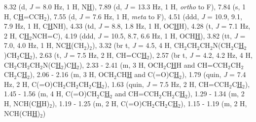 {{{{{{{{{{{{{{{{{	8.32 (d, \textit{J} = 8.0 Hz, 1 H, N\underline{H}), 
	7.89 (d, \textit{J} = 13.3 Hz, 1 H, \textit{ortho} to F), 
	7.84 (s, 1 H, C\underline{H}=CCH$_2$), 
	7.55 (d, \textit{J} = 7.6 Hz, 1 H, \textit{meta} to F), 
	4.51 (ddd, \textit{J} = 10.9, 9.1, 7.9 Hz, 1 H, C\underline{H}NH), 
	4.33 (td, \textit{J} = 8.8, 1.8 Hz, 1 H, OC\underline{H}H), 
	4.28 (t, \textit{J} = 7.1 Hz, 2 H, C\underline{H}$_2$NCH=C), 
	4.19 (ddd, \textit{J} = 10.5, 8.7, 6.6 Hz, 1 H, OCH\underline{H}), 
	3.82 (tt, \textit{J} = 7.0, 4.0 Hz, 1 H, NC\underline{H}(CH$_2$)$_2$), 
	3.32 (br t, \textit{J} = 4.5, 4 H, CH$_2$CH$_2$CH$_2$N(CH$_2$C\underline{H}$_2$)CH$_2$C\underline{H}$_2$), 
	2.63 (t, \textit{J} = 7.5 Hz, 2 H, CH=CC\underline{H}$_2$), 
	2.57 (br t, \textit{J} = 4.2, 4.2 Hz, 4 H, CH$_2$CH$_2$CH$_2$N(C\underline{H}$_2$)C\underline{H}$_2$), 
	2.33 - 2.41 (m, 3 H, OCH$_2$C\underline{H}H and CH=CCH$_2$CH$_2$CH$_2$C\underline{H}$_2$), 
	2.06 - 2.16 (m, 3 H, OCH$_2$CH\underline{H} and C(=O)C\underline{H}$_2$), 
	1.79 (quin, \textit{J} = 7.4 Hz, 2 H, C(=O)CH$_2$CH$_2$CH$_2$C\underline{H}$_2$), 
	1.63 (quin, \textit{J} = 7.5 Hz, 2 H, CH=CCH$_2$C\underline{H}$_2$), 
	1.45 - 1.56 (m, 4 H, C(=O)CH$_2$C\underline{H}$_2$ and CH=CCH$_2$CH$_2$C\underline{H}$_2$), 
	1.29 - 1.34 (m, 2 H, NCH(C\underline{H}H)$_2$), 
	1.19 - 1.25 (m, 2 H, C(=O)CH$_2$CH$_2$C\underline{H}$_2$), 
	1.15 - 1.19 (m, 2 H, NCH(CH\underline{H})$_2$)
\\[1\baselineskip]
}}}}}}}}}}}}}}}}}
